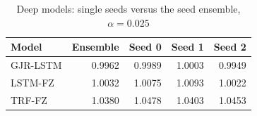 \begin{table}[htbp]
\centering
\footnotesize
\caption{Deep models: single seeds versus the seed ensemble, $\alpha=0.025$}
\label{tab:seeds}
\begin{tabular}{lrrrr}
\toprule
Model & Ensemble & Seed 0 & Seed 1 & Seed 2 \\
\midrule
GJR-LSTM & 0.9962 & 0.9989 & 1.0003 & 0.9949 \\
LSTM-FZ & 1.0032 & 1.0075 & 1.0093 & 1.0022 \\
TRF-FZ & 1.0380 & 1.0478 & 1.0403 & 1.0453 \\
\bottomrule
\end{tabular}
\end{table}